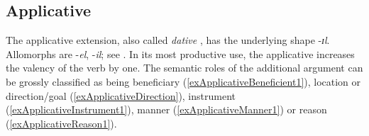 \subsection{Applicative}
The applicative extension, also called \textit{dative} \citep{SchadebergT2003a}, has the underlying shape \mbox{-\textit{ɪl}}. Allomorphs are \mbox{-\textit{el}}, \mbox{-\textit{il}}; see . In its most productive use, the applicative increases the valency of the verb by one. The semantic roles of the additional argument can be grossly classified as being beneficiary (\ref{exApplicativeBeneficient1}), location or direction/goal (\ref{exApplicativeDirection}), instrument (\ref{exApplicativeInstrument1}), manner (\ref{exApplicativeManner1}) or reason (\ref{exApplicativeReason1}).

